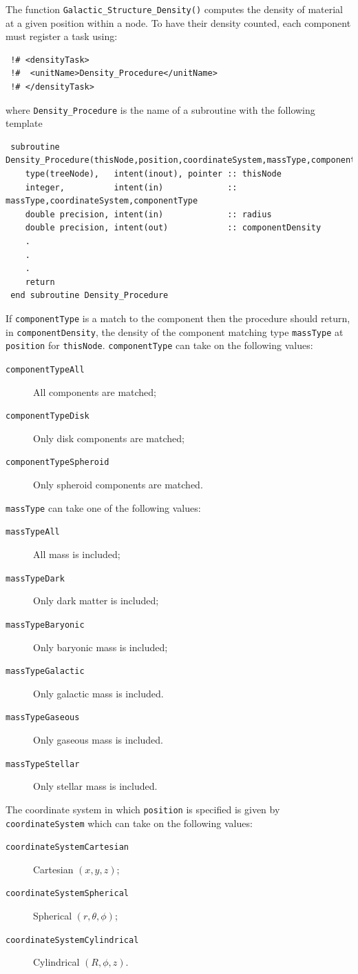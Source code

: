 The function {\tt Galactic\_Structure\_Density()} computes the density of material at a given position within a node. To have their density counted, each component must register a task using:
\begin{verbatim}
 !# <densityTask>
 !#  <unitName>Density_Procedure</unitName>
 !# </densityTask>
\end{verbatim}
where {\tt Density\_Procedure} is the name of a subroutine with the following template
\begin{verbatim}
 subroutine Density_Procedure(thisNode,position,coordinateSystem,massType,componentType,componentDensity)
    type(treeNode),   intent(inout), pointer :: thisNode
    integer,          intent(in)             :: massType,coordinateSystem,componentType
    double precision, intent(in)             :: radius
    double precision, intent(out)            :: componentDensity
    .
    .
    .
    return
 end subroutine Density_Procedure
\end{verbatim}
If {\tt componentType} is a match to the component then the procedure should return, in {\tt componentDensity}, the density of the component matching type {\tt massType} at {\tt position} for {\tt thisNode}. {\tt componentType} can take on the following values:
\begin{description}
 \item [{\tt componentTypeAll}] All components are matched;
 \item [{\tt componentTypeDisk}] Only disk components are matched;
 \item [{\tt componentTypeSpheroid}] Only spheroid components are matched.
\end{description}
{\tt massType} can take one of the following values:
\begin{description}
 \item [{\tt massTypeAll}] All mass is included;
 \item [{\tt massTypeDark}] Only dark matter is included;
 \item [{\tt massTypeBaryonic}] Only baryonic mass is included;
 \item [{\tt massTypeGalactic}] Only galactic mass is included.
 \item [{\tt massTypeGaseous}] Only gaseous mass is included.
 \item [{\tt massTypeStellar}] Only stellar mass is included.
\end{description}
The coordinate system in which {\tt position} is specified is given by {\tt coordinateSystem} which can take on the following values:
\begin{description}
 \item [{\tt coordinateSystemCartesian}] Cartesian $(x,y,z)$;
 \item [{\tt coordinateSystemSpherical}] Spherical $(r,\theta,\phi)$;
 \item [{\tt coordinateSystemCylindrical}] Cylindrical $(R,\phi,z)$.
\end{description}

